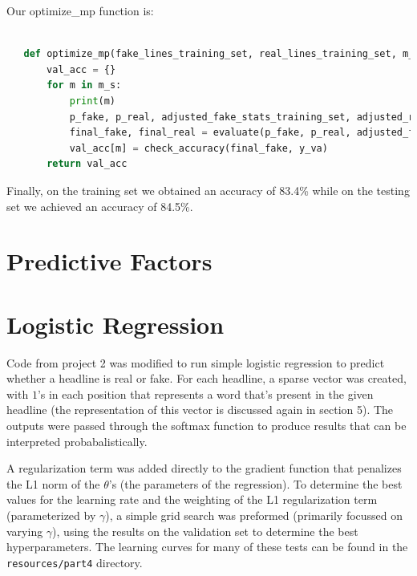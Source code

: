 \documentclass{article}
\begin{document}
   Our optimize\_mp function is:
   \begin{lstlisting}[language=Python]

   def optimize_mp(fake_lines_training_set, real_lines_training_set, m_s, mp):
       val_acc = {}
       for m in m_s:
           print(m)
           p_fake, p_real, adjusted_fake_stats_training_set, adjusted_real_stats_training_set = training_part(fake_lines_training_set, real_lines_training_set, m, mp)
           final_fake, final_real = evaluate(p_fake, p_real, adjusted_fake_stats_training_set, adjusted_real_stats_training_set, validation_set)
           val_acc[m] = check_accuracy(final_fake, y_va)
       return val_acc
   \end{lstlisting}

   Finally, on the training set we obtained an accuracy of 83.4\% while on the testing set
   we achieved an accuracy of 84.5\%.



   \section{Predictive Factors}




   \section{Logistic Regression}
   Code from project 2 was modified to run simple logistic regression to predict whether a headline is real
   or fake. For each headline, a sparse vector was created, with $1$'s in each position that represents a word
   that's present in the given headline (the representation of this vector is discussed again in section 5).
   The outputs were passed through the softmax function to produce results that can be interpreted probabalistically.

   A regularization term was added directly to the gradient function that penalizes the L1 norm of the
   $\theta$'s (the parameters of the regression).
   To determine the best values for the learning rate and the weighting of the L1 regularization term (parameterized
   by $\gamma$), a simple grid search was preformed (primarily focussed on varying $\gamma$), using the results on
   the validation set to determine the best hyperparameters. The learning curves for many of these tests can be
   found in the \texttt{resources/part4} directory.
\end{document}
